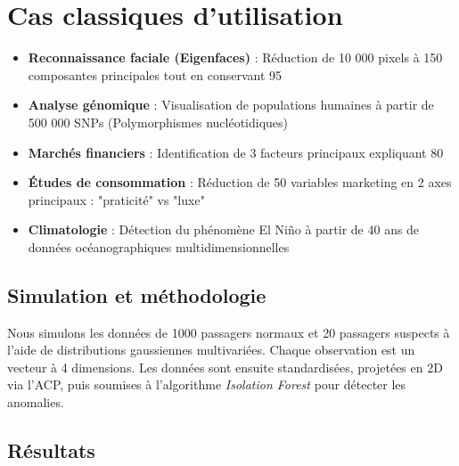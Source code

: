 \documentclass[a4paper,12pt]{report}
\begin{document}
\section{Cas classiques d'utilisation}
\begin{itemize}
    \item \textbf{Reconnaissance faciale (Eigenfaces)} : 
    Réduction de 10 000 pixels à 150 composantes principales tout en conservant 95\  
    
    \item \textbf{Analyse génomique} : 
    Visualisation de populations humaines à partir de 500 000 SNPs (Polymorphismes nucléotidiques)
    
    \item \textbf{Marchés financiers} : 
    Identification de 3 facteurs principaux expliquant 80\  
    
    \item \textbf{Études de consommation} : 
    Réduction de 50 variables marketing en 2 axes principaux : "praticité" vs "luxe"
    
    \item \textbf{Climatologie} : 
    Détection du phénomène El Niño à partir de 40 ans de données océanographiques multidimensionnelles
\end{itemize}

\subsection{Simulation et m\'ethodologie}
Nous simulons les donn\'ees de 1000 passagers normaux et 20 passagers suspects \`a l'aide de distributions gaussiennes multivariées. Chaque observation est un vecteur \`a 4 dimensions. Les donn\'ees sont ensuite standardis\'ees, projet\'ees en 2D via l'ACP, puis soumises \`a l'algorithme \textit{Isolation Forest} pour d\'etecter les anomalies.

\subsection{R\'esultats}
\end{document}
